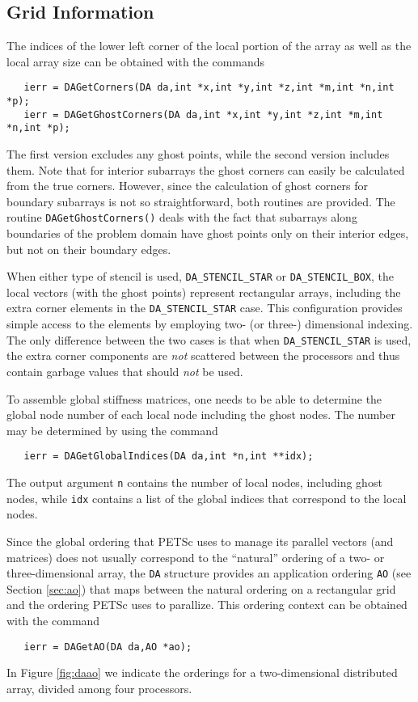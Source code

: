 \subsection{Grid Information}

The indices of the lower left corner of the local portion of the array 
as well as the local array size can be obtained with the commands
 
\begin{verbatim}
   ierr = DAGetCorners(DA da,int *x,int *y,int *z,int *m,int *n,int *p);
   ierr = DAGetGhostCorners(DA da,int *x,int *y,int *z,int *m,int *n,int *p);
\end{verbatim}
The first version excludes any ghost points, while the second version
includes them. Note that for interior subarrays the ghost corners can
easily be calculated from the true corners.  However, since the
calculation of ghost corners for boundary subarrays is not so
straightforward, both routines are provided.
The routine  {\tt DAGetGhostCorners()}
deals with the fact that subarrays along boundaries of the problem
domain have ghost points only on their interior edges, but not on
their boundary edges.

When either type of stencil is used, {\tt DA\_STENCIL\_STAR} or 
{\tt DA\_STENCIL\_BOX}, the local vectors (with the ghost points) 
represent rectangular arrays, including the extra corner elements in 
the {\tt DA\_STENCIL\_STAR} case. This configuration provides simple 
access to the elements by employing two- (or three-) dimensional indexing. 
The only difference between the 
two cases is that when {\tt DA\_STENCIL\_STAR} is used, the extra 
corner components are {\em not} scattered between the processors and thus
contain garbage values that should {\em not} be used.

To assemble global stiffness matrices, one needs to be 
able to determine the global node number of each local node 
including the ghost nodes. The number may be determined by using the 
command 
\begin{verbatim}
   ierr = DAGetGlobalIndices(DA da,int *n,int **idx);
\end{verbatim}
The output argument {\tt n} contains the number of 
local nodes, including ghost nodes, while {\tt idx} contains
a list of the global indices that correspond to the local nodes.

Since the global ordering that PETSc uses to manage its parallel vectors 
(and matrices) does not usually correspond to the ``natural'' ordering 
of a two- or three-dimensional array, the {\tt DA} structure provides 
an application ordering {\tt AO} (see Section \ref{sec:ao}) that maps 
between the natural ordering on a rectangular grid and the ordering PETSc
uses to parallize. This ordering context can be obtained with the command
\begin{verbatim}
   ierr = DAGetAO(DA da,AO *ao);
\end{verbatim}
In Figure \ref{fig:daao} we indicate the orderings for a two-dimensional distributed 
array, divided among four processors.


